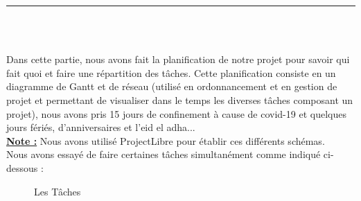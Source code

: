 \documentclass[12pt]{report}
\begin{document}
\newpage

\vspace*{-0.2in}

\begin{center}
    {\color{Blue} \rule{6.2in}{1.4mm} }\\
    \vspace{0.1in}
    \scshape{\fontsize{34}{46}{\bfseries{\color{Blue}{Planification}}}}
    \\
    \vspace{0.12in}
\end{center}
\hspace*{-0.05in}
Dans cette partie, nous avons fait la planification de notre projet pour savoir qui fait quoi et faire une répartition des tâches. Cette planification consiste en un diagramme de Gantt et de réseau (utilisé en ordonnancement et en gestion de projet et permettant de visualiser dans le temps les diverses tâches composant un projet), nous avons pris 15 jours de confinement à cause de covid-19 et quelques jours fériés, d'anniversaires et l'eid el adha...
\\
\textbf{\underline{Note :}} Nous avons utilisé ProjectLibre pour établir ces différents schémas.
\\
Nous avons essayé de faire certaines tâches simultanément comme indiqué ci-dessous :

\vspace{0.15in}

\begin{figure}[h]
\centering
\caption{Les Tâches}
\end{figure}
\end{document}
